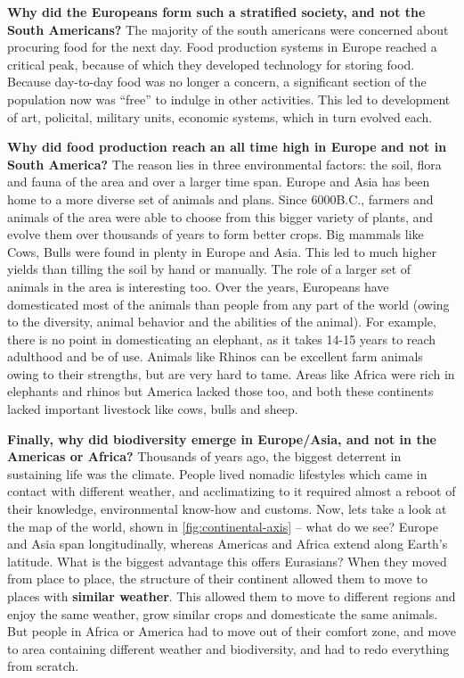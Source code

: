 \textbf{Why did the Europeans form such a stratified society, and not the South Americans?} The majority of the south americans were concerned about procuring food for the next day. Food production systems in Europe reached a critical peak, because of which they developed technology for storing food. Because day-to-day food was no longer a concern, a significant section of the population now was ``free'' to indulge in other activities. This led to development of art, policital, military units, economic systems, which in turn evolved each.

\textbf{Why did food production reach an all time high in Europe and not in South America?} The reason lies in three environmental factors: the soil, flora and fauna of the area and over a larger time span. Europe and Asia has been home to a more diverse set of animals and plans. Since 6000B.C., farmers and animals of the area were able to choose from this bigger variety of plants, and evolve them over thousands of years to form better crops. Big mammals like Cows, Bulls were found in plenty in Europe and Asia. This led to much higher yields than tilling the soil by hand or manually. The role of a larger set of animals in the area is interesting too. Over the years, Europeans have domesticated most of the animals than people from any part of the world (owing to the diversity, animal behavior and the abilities of the animal). For example, there is no point in domesticating an elephant, as it takes 14-15 years to reach adulthood and be of use. Animals like Rhinos can be excellent farm animals owing to their strengths, but are very hard to tame. Areas like Africa were rich in elephants and rhinos but America lacked those too, and both these continents lacked important livestock like cows, bulls and sheep.

\textbf{Finally, why did biodiversity emerge in Europe/Asia, and not in the Americas or Africa?} Thousands of years ago, the biggest deterrent in sustaining life was the climate. People lived nomadic lifestyles which came in contact with different weather, and acclimatizing to it required almost a reboot of their knowledge, environmental know-how and customs. Now, lets take a look at the map of the world, shown in \ref{fig:continental-axis} -- what do we see? Europe and Asia span longitudinally, whereas Americas and Africa extend along Earth's latitude. What is the biggest advantage this offers Eurasians? When they moved from place to place, the structure of their continent allowed them to move to places with \textbf{similar weather}. This allowed them to move to different regions and enjoy the same weather, grow similar crops and domesticate the same animals. But people in Africa or America had to move out of their comfort zone, and move to area containing different weather and biodiversity, and had to redo everything from scratch.

